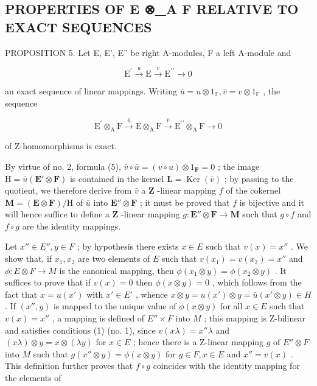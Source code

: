 \subsection{PROPERTIES OF E ⊗\_A F RELATIVE TO EXACT SEQUENCES}

PROPOSITION 5. Let E, E', E'' be right A-modules, F a left A-module and

\[
\mathrm{E} ^ {\prime} \stackrel {u} {\longrightarrow} \mathrm{E} \stackrel {v} {\longrightarrow} \mathrm{E} ^ {\prime \prime} \longrightarrow 0\tag{14}
\]

an exact sequence of linear mappings. Writing \(\bar{u} = u \otimes 1_{\mathbb{F}}, \bar{v} = v \otimes 1_{\mathbb{F}}\) , the sequence

\[
\mathrm{E} ^ {\prime} \otimes_ {\mathrm{A}} \mathrm{F} \xrightarrow {\bar {u}} \mathrm{E} \otimes_ {\mathrm{A}} \mathrm{F} \xrightarrow {\bar {v}} \mathrm{E} ^ {\prime \prime} \otimes_ {\mathrm{A}} \mathrm{F} \longrightarrow 0\tag{15}
\]

of Z-homomorphisms is exact.

By virtue of no. 2, formula (5), \(\bar{v} \circ \bar{u} = (v \circ u) \otimes 1_{\mathbf{F}} = 0\) ; the image \(\mathrm{H} = \bar{u} (\mathbf{E}' \otimes \mathbf{F})\) is contained in the kernel \(\mathbf{L} = \operatorname{Ker}(\bar{v})\) ; by passing to the quotient, we therefore derive from \(\bar{v}\) a \(\mathbf{Z}\) -linear mapping \(f\) of the cokernel \(\mathbf{M} = (\mathbf{E} \otimes \mathbf{F}) / \mathrm{H}\) of \(\bar{u}\) into \(\mathbf{E}'' \otimes \mathbf{F}\) ; it must be proved that \(f\) is bijective and it will hence suffice to define a \(\mathbf{Z}\) -linear mapping \(g: \mathbf{E}'' \otimes \mathbf{F} \to \mathbf{M}\) such that \(g \circ f\) and \(f \circ g\) are the identity mappings.

Let \(x'' \in E'', y \in F\) ; by hypothesis there exists \(x \in E\) such that \(v(x) = x''\) . We show that, if \(x_1, x_2\) are two elements of \(E\) such that \(v(x_1) = v(x_2) = x''\) and \(\phi: E \otimes F \to M\) is the canonical mapping, then \(\phi(x_1 \otimes y) = \phi(x_2 \otimes y)\) . It suffices to prove that if \(v(x) = 0\) then \(\phi(x \otimes y) = 0\) , which follows from the fact that \(x = u(x')\) with \(x' \in E'\) , whence \(x \otimes y = u(x') \otimes y = \bar{u}(x' \otimes y) \in H\) . If \((x'', y)\) is mapped to the unique value of \(\phi(x \otimes y)\) for all \(x \in E\) such that \(v(x) = x''\) , a mapping is defined of \(E'' \times F\) into \(M\) ; this mapping is Z-bilinear and satisfies conditions (1) (no. 1), since \(v(x\lambda) = x''\lambda\) and \((x\lambda) \otimes y = x \otimes (\lambda y)\) for \(x \in E\) ; hence there is a Z-linear mapping \(g\) of \(E'' \otimes F\) into \(M\) such that \(g(x'' \otimes y) = \phi(x \otimes y)\) for \(y \in F, x \in E\) and \(x'' = v(x)\) . This definition further proves that \(f \circ g\) coincides with the identity mapping for the elements of

